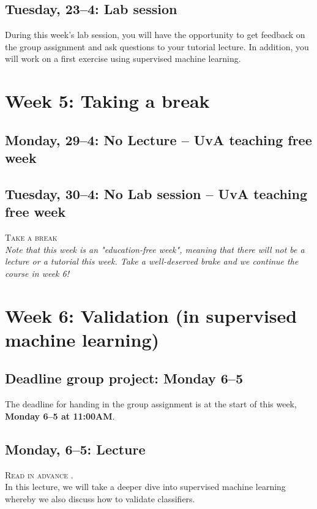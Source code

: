 \subsection*{Tuesday, 23--4: Lab session}
During this week's lab session, you will have the opportunity to get feedback on the group assignment and ask questions to your tutorial lecture. In addition, you will work on a first exercise using supervised machine learning.

\section*{Week 5: Taking a break}

\subsection*{Monday, 29--4: No Lecture -- UvA teaching free week}
\subsection*{Tuesday, 30--4: No Lab session -- UvA teaching free week}

\textsc{ Take a break}\\

\emph{Note that this week is an "education-free week", meaning that there will not be a lecture or a tutorial this week. Take a well-deserved brake and we continue the course in week 6!}

\section*{Week 6: Validation (in supervised machine learning)}

\subsection*{Deadline group project: Monday 6--5}
The deadline for handing in the group assignment is at the start of this week, \textbf{Monday 6--5 at 11:00AM}.

\subsection*{Monday, 6--5: Lecture}
\textsc{ Read in advance \cite{birkenmaier_search_2023}.}\\

In this lecture, we will take a deeper dive into supervised machine learning whereby we also discuss how to validate classifiers.

